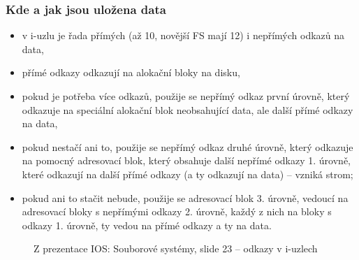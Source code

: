 \documentclass[a4paper, 11pt]{article}
\begin{document}
\subsubsection{Kde a jak jsou uložena data}
\begin{itemize}
    \item v i-uzlu je řada přímých (až 10, novější FS mají 12) i nepřímých odkazů na data,
    \item přímé odkazy odkazují na alokační bloky na disku,
    \item pokud je potřeba více odkazů, použije se nepřímý odkaz první úrovně, který odkazuje na speciální alokační blok neobsahující data, ale další přímé odkazy na data,
    \item pokud nestačí ani to, použije se nepřímý odkaz druhé úrovně, který odkazuje na pomocný adresovací blok, který obsahuje další nepřímé odkazy 1. úrovně, které odkazují na další přímé odkazy (a ty odkazují na data) -- vzniká strom;
    \item pokud ani to stačit nebude, použije se adresovací blok 3. úrovně, vedoucí na adresovací bloky s nepřímými odkazy 2. úrovně, každý z nich na bloky s odkazy 1. úrovně, ty vedou na přímé odkazy a ty na data.
\end{itemize}

\begin{figure}[htb]
    \centering
    \caption{Z prezentace IOS: Souborové systémy, slide 23 -- odkazy v i-uzlech}
\end{figure}
\end{document}
